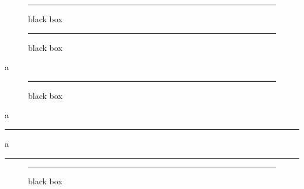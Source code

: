 \documentclass[twocolumn]{article}
\begin{document}
\begin{figure*}[t]\centering
  \rule{\columnwidth}{0.25\textheight}
  \caption{black box}
\end{figure*}

\lipsum[1-2]
\par\hrulefill\par\hrulefill\par

\lipsum[1-2]
\par\hrulefill\par\hrulefill\par

\clearpage

\begin{figure*}[t]\centering
  \rule{\columnwidth}{0.25\textheight}
  \caption{black box}
\end{figure*}

\lipsum[1-2]
\par\hrulefill\par\hrulefill\par

a
\vfill
\lipsum[1-2]
\newpage

\begin{figure*}[t]\centering
  \rule{\columnwidth}{0.25\textheight}
  \caption{black box}
\end{figure*}

a\par
\vfill\hrule\newpage
a\par\vfill\hrule\newpage

\newpage

\begin{figure*}[t]\centering
  \rule{\columnwidth}{0.25\textheight}
  \caption{black box}
\end{figure*}

\lipsum[1-6]
\end{document}
